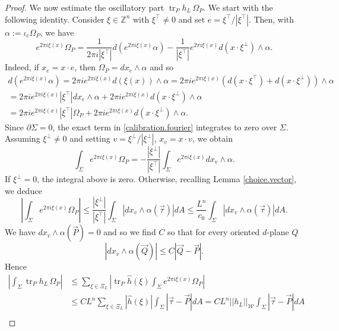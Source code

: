 \documentclass[11pt]{amsart}
\def\Z{\mathbb Z}
\def\tr{\operatorname{tr}}
\theoremstyle{remark}
\theoremstyle{definition}
\begin{document}
\begin{proof}
		We now estimate the oscillatory part  $\tr _P h_L\,\Omega_P$. We start with the following identity. Consider $\xi\in \Z^n$ with $\xi^{\top}\neq 0$ and set $e=\xi^{\top}/|\xi^{\top}|$. Then, {with $\alpha:=\iota_e\Omega_P$,} we have 
		\begin{equation}\label{calibration.fourier} 
			e^{2\pi i \xi(x)}\Omega_P=\frac{1}{2\pi i|\xi^{\top}|}d(e^{2\pi i \xi(x)}\alpha)-\frac{1}{|\xi^{\top}|}e^{2\pi i \xi(x)}d(x\cdot\xi^{\bot})\wedge \alpha.
		\end{equation}
		Indeed, if $x_e=x\cdot e$, then $\Omega_P=dx_e\wedge \alpha$ and so
		\begin{multline*}
			d(e^{2\pi i \xi(x)}\alpha)=2\pi i e^{2\pi i \xi(x)}d(\xi(x))\wedge \alpha=2\pi i e^{2\pi i \xi(x)}\left(d(x\cdot\xi^{\top})+d(x\cdot\xi^{\bot})\right)\wedge \alpha\\
			=2\pi i e^{2\pi i \xi(x)}|\xi^{\top}|dx_e\wedge \alpha+2\pi i e^{2\pi i \xi(x)}d(x\cdot\xi^{\bot})\wedge \alpha\\
			=2\pi i e^{2\pi i \xi(x)}|\xi^{\top}|\Omega_P+2\pi i e^{2\pi i \xi(x)}d(x\cdot\xi^{\bot})\wedge \alpha.
		\end{multline*}
		Since $\partial\Sigma=0$, the exact term in \eqref{calibration.fourier} integrates to zero over $\Sigma$. Assuming $\xi^{\bot}\neq 0$ and setting $v=\xi^{\bot}/|\xi^{\bot}|$, $x_v=x\cdot v$, we obtain
		\begin{equation}\label{fourier.integration}
			\int_\Sigma e^{2\pi i \xi(x)}\Omega_P=-\frac{|\xi^{\bot}|}{|\xi^{\top}|}\int_{\Sigma}e^{2\pi i \xi(x)}dx_v\wedge \alpha.
		\end{equation}
		If $\xi^{\bot}=0$, the integral above is zero. 
		Otherwise, recalling Lemma \ref{choice.vector}, we deduce
		$$
		\left|\int_\Sigma e^{2\pi i \xi(x)}\Omega_P\right|\leq \frac{|\xi^{\bot}|}{|\xi^{\top}|}\int_{\Sigma}|dx_v\wedge \alpha(\vec\tau)|dA\leq \frac{L^n}{c_0}\int_{\Sigma}|dx_v\wedge \alpha(\vec\tau)|dA.
		$$
		We have $dx_v\wedge \alpha(\vec P)=0$ and so we find $C$ so that  for every oriented $d$-plane $Q$
		\begin{equation}\label{fourier.integration2}
			|dx_v\wedge \alpha(\vec Q)|\leq C|\vec Q-\vec P|.
		\end{equation}
		Hence
		\begin{align*}
			\left|\int_{\Sigma}\tr _P h_L\,\Omega_P\right|&\leq\sum_{\xi\in\Xi_L}\left|\tr _P\hat h(\xi)\int_\Sigma e^{2\pi i \xi(x)}\Omega_P \right|\\
			&\leq CL^n\!\sum_{\xi\in\Xi_L}\!|\hat h(\xi)|\!\int_{\Sigma}|\vec \tau-\vec P|dA\!=\!CL^n\!||h_L||_{\mathcal W}\!\int_{\Sigma}|\vec \tau-\vec P|dA\\

\end{align*}
\end{proof}
\end{document}
